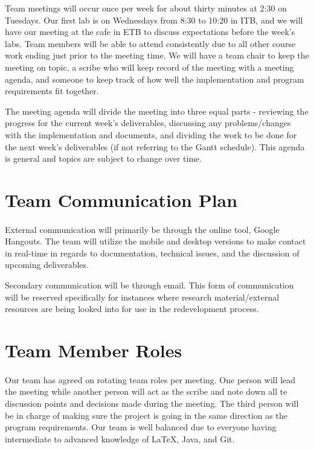 \documentclass{article}
\begin{document}
Team meetings will occur once per week for about thirty minutes at 2:30 on Tuesdays. Our first lab is on Wednesdays from 8:30 to 10:20 in ITB, and we will have our meeting at the cafe in ETB to discuss expectations before the week's labs. Team members will be able to attend consistently due to all other course work ending just prior to the meeting time. We will have a team chair to keep the meeting on topic, a scribe who will keep record of the meeting with a meeting agenda, and someone to keep track of how well the implementation and program requirements fit together.\par The meeting agenda will divide the meeting into three equal parts - reviewing the progress for the current week's deliverables, discussing any problems/changes with the implementation and documents, and dividing the work to be done for the next week's deliverables (if not referring to the Gantt schedule). This agenda is general and topics are subject to change over time.

\section{Team Communication Plan}

\paragraph{}
External communication will primarily be through the online tool, Google Hangouts. The team will utilize the mobile and desktop versions to make contact in real-time in regards to documentation, technical issues, and the discussion of upcoming deliverables.\par Secondary communication will be through email. This form of communication will be reserved specifically for instances where research material/external resources are being looked into for use in the redevelopment process.

\section{Team Member Roles}

\paragraph{}
Our team has agreed on rotating team roles per meeting. One person will lead the meeting while another person will act as the scribe and note down all te discussion points and decisions made during the meeting. The third person will be in charge of making sure the project is going in the same direction as the program requirements. Our team is well balanced due to everyone having intermediate to advanced knowledge of LaTeX, Java, and Git.
\end{document}
